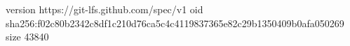 version https://git-lfs.github.com/spec/v1
oid sha256:f02c80b2342c8df1c210d76ca5c4c4119837365e82c29b1350409b0afa050269
size 43840
